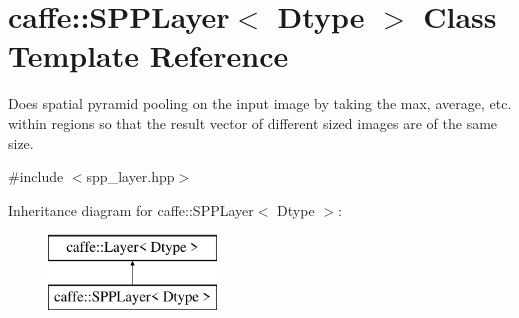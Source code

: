 \hypertarget{classcaffe_1_1SPPLayer}{}\section{caffe\+:\+:S\+P\+P\+Layer$<$ Dtype $>$ Class Template Reference}
\label{classcaffe_1_1SPPLayer}


Does spatial pyramid pooling on the input image by taking the max, average, etc. within regions so that the result vector of different sized images are of the same size.  




{\ttfamily \#include $<$spp\+\_\+layer.\+hpp$>$}

Inheritance diagram for caffe\+:\+:S\+P\+P\+Layer$<$ Dtype $>$\+:\begin{figure}[H]
\begin{center}
\leavevmode
\includegraphics[height=2.000000cm]{classcaffe_1_1SPPLayer}
\end{center}
\end{figure}
